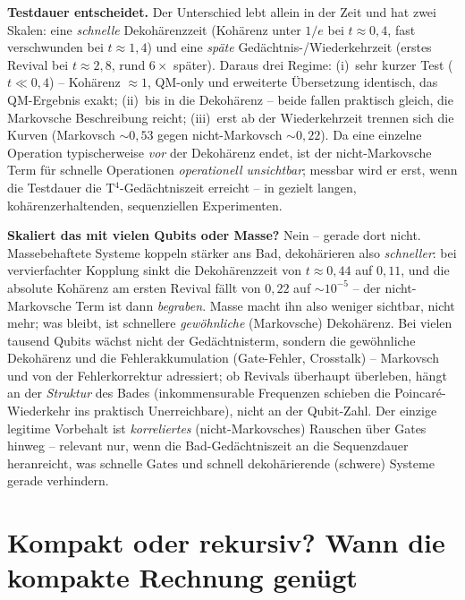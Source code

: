 \smallskip
\noindent\textbf{Testdauer entscheidet.} Der Unterschied lebt allein in der Zeit
und hat zwei Skalen: eine \emph{schnelle} Dekohärenzzeit (Kohärenz unter $1/e$ bei
$t\approx0{,}4$, fast verschwunden bei $t\approx1{,}4$) und eine \emph{späte}
Gedächtnis-/Wiederkehrzeit (erstes Revival bei $t\approx2{,}8$, rund $6\times$
später). Daraus drei Regime: (i)~sehr kurzer Test ($t\ll0{,}4$) -- Kohärenz
$\approx1$, QM-only und erweiterte Übersetzung identisch, das QM-Ergebnis exakt;
(ii)~bis in die Dekohärenz -- beide fallen praktisch gleich, die Markovsche
Beschreibung reicht; (iii)~erst ab der Wiederkehrzeit trennen sich die Kurven
(Markovsch $\sim0{,}53$ gegen nicht-Markovsch $\sim0{,}22$). Da eine einzelne
Operation typischerweise \emph{vor} der Dekohärenz endet, ist der nicht-Markovsche
Term für schnelle Operationen \emph{operationell unsichtbar}; messbar wird er erst,
wenn die Testdauer die T$^4$-Gedächtniszeit erreicht -- in gezielt langen,
kohärenzerhaltenden, sequenziellen Experimenten.

\smallskip
\noindent\textbf{Skaliert das mit vielen Qubits oder Masse?} Nein -- gerade dort
nicht. Massebehaftete Systeme koppeln stärker ans Bad, dekohärieren also
\emph{schneller}: bei vervierfachter Kopplung sinkt die Dekohärenzzeit von
$t\approx0{,}44$ auf $0{,}11$, und die absolute Kohärenz am ersten Revival fällt
von $0{,}22$ auf $\sim10^{-5}$ -- der nicht-Markovsche Term ist dann
\emph{begraben}. Masse macht ihn also weniger sichtbar, nicht mehr; was bleibt,
ist schnellere \emph{gewöhnliche} (Markovsche) Dekohärenz. Bei vielen tausend
Qubits wächst nicht der Gedächtnisterm, sondern die gewöhnliche Dekohärenz und die
Fehlerakkumulation (Gate-Fehler, Crosstalk) -- Markovsch und von der
Fehlerkorrektur adressiert; ob Revivals überhaupt überleben, hängt an der
\emph{Struktur} des Bades (inkommensurable Frequenzen schieben die
Poincaré-Wiederkehr ins praktisch Unerreichbare), nicht an der Qubit-Zahl. Der
einzige legitime Vorbehalt ist \emph{korreliertes} (nicht-Markovsches) Rauschen
über Gates hinweg -- relevant nur, wenn die Bad-Gedächtniszeit an die
Sequenzdauer heranreicht, was schnelle Gates und schnell dekohärierende (schwere)
Systeme gerade verhindern.

\section{Kompakt oder rekursiv? Wann die kompakte Rechnung genügt}

